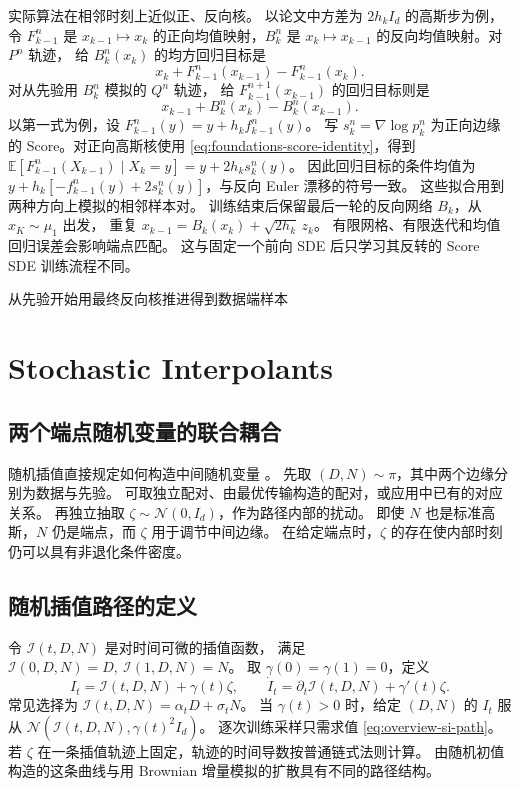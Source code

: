 实际算法在相邻时刻上近似正、反向核。
以论文中方差为 \(2h_k I_d\) 的高斯步为例，令 \(F^n_{k-1}\) 是
\(x_{k-1}\mapsto x_k\) 的正向均值映射，\(B^n_k\) 是
\(x_k\mapsto x_{k-1}\) 的反向均值映射。对 \(P^n\) 轨迹，
给 \(B^n_k(x_k)\) 的均方回归目标是
\[
  x_k+F^n_{k-1}(x_{k-1})-F^n_{k-1}(x_k).
\]
对从先验用 \(B^n_k\) 模拟的 \(Q^n\) 轨迹，
给 \(F^{n+1}_{k-1}(x_{k-1})\) 的回归目标则是
\[
  x_{k-1}+B^n_k(x_k)-B^n_k(x_{k-1}).
\]
以第一式为例，设 \(F^n_{k-1}(y)=y+h_k f^n_{k-1}(y)\)。
写 \(s^n_k=\nabla\log p_k^n\) 为正向边缘的 Score。对正向高斯核使用
\eqref{eq:foundations-score-identity}，得到
\(\mathbb E[F^n_{k-1}(X_{k-1})\mid X_k=y]=y+2h_k s^n_k(y)\)。
因此回归目标的条件均值为
\(y+h_k[-f^n_{k-1}(y)+2s^n_k(y)]\)，与反向 Euler 漂移的符号一致。
这些拟合用到两种方向上模拟的相邻样本对。
训练结束后保留最后一轮的反向网络 \(B_k\)，从 \(x_K\sim\mu_1\) 出发，
重复 \(x_{k-1}=B_k(x_k)+\sqrt{2h_k}\,z_k\)。
有限网格、有限迭代和均值回归误差会影响端点匹配。
这与固定一个前向 SDE 后只学习其反转的 Score SDE 训练流程不同。

  {从先验开始}{用最终反向核推进}{得到数据端样本}

\section{Stochastic Interpolants}
\label{sec:overview-interpolants}

\subsection{两个端点随机变量的联合耦合}

随机插值直接规定如何构造中间随机变量 \cite{albergo2025si}。
先取 \((D,N)\sim\pi\)，其中两个边缘分别为数据与先验。
可取独立配对、由最优传输构造的配对，或应用中已有的对应关系。
再独立抽取 \(\zeta\sim\mathcal N(0,I_d)\)，作为路径内部的扰动。
即使 \(N\) 也是标准高斯，\(N\) 仍是端点，而 \(\zeta\) 用于调节中间边缘。
在给定端点时，\(\zeta\) 的存在使内部时刻仍可以具有非退化条件密度。

\subsection{随机插值路径的定义}

令 \(\mathcal I(t,D,N)\) 是对时间可微的插值函数，
满足 \(\mathcal I(0,D,N)=D,\ \mathcal I(1,D,N)=N\)。
取 \(\gamma(0)=\gamma(1)=0\)，定义
\begin{equation}
  I_t=\mathcal I(t,D,N)+\gamma(t)\zeta,\qquad
  \dot I_t=\partial_t\mathcal I(t,D,N)+\gamma'(t)\zeta .
  \label{eq:overview-si-path}
\end{equation}
常见选择为 \(\mathcal I(t,D,N)=\alpha_tD+\sigma_tN\)。
当 \(\gamma(t)>0\) 时，给定 \((D,N)\) 的 \(I_t\) 服从
\(\mathcal N(\mathcal I(t,D,N),\gamma(t)^2 I_d)\)。
逐次训练采样只需求值 \eqref{eq:overview-si-path}。
若 \(\zeta\) 在一条插值轨迹上固定，轨迹的时间导数按普通链式法则计算。
由随机初值构造的这条曲线与用 Brownian 增量模拟的扩散具有不同的路径结构。

